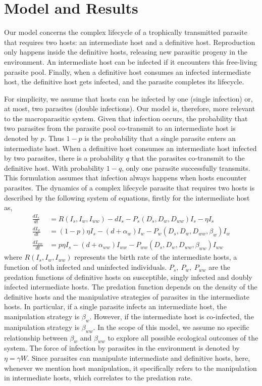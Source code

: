 \documentclass[11pt]{article}
\begin{document}
\section*{Model and Results}

Our model concerns the complex lifecycle of a trophically transmitted parasite that requires two hosts: an intermediate host and a definitive host. 
Reproduction only happens inside the definitive hosts, releasing new parasitic progeny in the environment. 
An intermediate host can be infected if it encounters this free-living parasite pool. 
Finally, when a definitive host consumes an infected intermediate host, the definitive host gets infected, and the parasite completes its lifecycle.

For simplicity, we assume that hosts can be infected by one (single infection) or, at most, two parasites (double infections). 
Our model is, therefore, more relevant to the macroparasitic system.
Given that infection occurs, the probability that two parasites from the parasite pool co-transmit to an intermediate host is denoted by  $p$. Thus $1-p$ is the probability that a single parasite enters an intermediate host. 
When a definitive host consumes an intermediate host infected by two parasites, there is a probability $q$ that the parasites co-transmit to the definitive host.
With probability $1-q$, only one parasite successfully transmits. 
This formulation assumes that infection always happens when hosts encounter parasites.
The dynamics of a complex lifecycle parasite that requires two hosts is described by the following system of equations, firstly for the intermediate host as,
%
\begin{align}
\frac{dI_s}{dt} &= R(I_s, I_w, I_{ww}) - d I_s - P_s(D_s, D_w, D_{ww}) I_s  - \eta  I_s \nonumber \\ 
\frac{dI_w}{dt} &=  (1 - p) \eta I_s  - (d + \alpha_w) I_w - P_w(D_s, D_w, D_{ww}, \beta_w) I_w \label{odes:ihosts} \\
\frac{dI_{ww}}{dt} &= p \eta I_s  - (d + \alpha_{ww}) I_{ww} - P_{ww}(D_s, D_w, D_{ww}, \beta_{ww}) I_{ww} \nonumber
\end{align}
%
where $R(I_s, I_w, I_{ww})$ represents the birth rate of the intermediate hosts, a function of both infected and uninfected individuals.
$P_s, \ P_w, \ P_{ww}$ are the predation functions of definitive hosts on susceptible, singly infected and doubly infected intermediate hosts. 
The predation function depends on the density of the definitive hosts and the manipulative strategies of parasites in the intermediate hosts. 
In particular, if a single parasite infects an intermediate host, the manipulation strategy is $\beta_w$. 
However, if the intermediate host is co-infected, the manipulation strategy is $\beta_{ww}$. 
In the scope of this model, we assume no specific relationship between $\beta_w$ and $\beta_{ww}$ to explore all possible ecological outcomes of the system. 
The force of infection by parasites in the environment is denoted by $\eta = \gamma W$. 
Since parasites can manipulate intermediate and definitive hosts, here, whenever we mention host manipulation, it specifically refers to the manipulation in intermediate hosts, which correlates to the predation rate.
\end{document}
